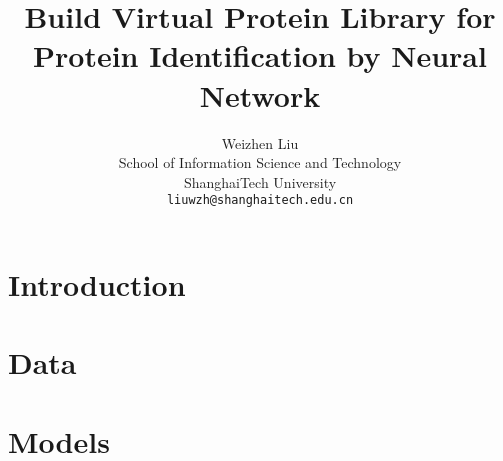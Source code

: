 \documentclass[final]{cvpr}
\begin{document}
\title{Build Virtual Protein Library for Protein Identification by Neural Network}

\author{Weizhen Liu\\
School of Information Science and Technology\\
ShanghaiTech University\\
{\tt\small liuwzh@shanghaitech.edu.cn}}

\maketitle


\section{Introduction}


\section{Data}


\section{Models}


{\small


}
\end{document}
